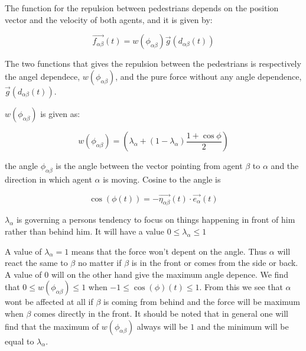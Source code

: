 The function for the repulsion between pedestrians depends on the position vector and the velocity of 
both agents, and it is given by:

\begin{equation}
        \vec{f_{\alpha \beta }}\left( t \right) = w\left(\phi_{\alpha \beta}\right)\vec{g}\left(d_{\alpha \beta}(t)\right)
    \label{eq:agentinteraction}
\end{equation}

The two functions that gives the repulsion between the pedestrians is respectively the angel dependece, $ w\left(\phi_{\alpha \beta}\right)$, and the pure force without any angle dependence, $\vec{g}\left(d_{\alpha \beta}(t)\right)$.

$ w\left(\phi_{\alpha \beta}\right)$ is given as: 

\begin{equation}
    w\left(\phi_{\alpha \beta}\right)=
    \left(
        \lambda_{\alpha} + \left(
            1 - \lambda_{\alpha}
        \right)
		\frac{1+\cos{\phi}}{2}
    \right) 
    \label{angleAB}
\end{equation}

the angle $\phi_{\alpha \beta}$ is the angle between the 
vector pointing from agent $\beta$ to $\alpha$ and the direction in which 
agent $\alpha$ is moving. Cosine to the angle is 

\begin{equation}
\cos \left( \phi \left( t \right) \right)
		= 
	- \vec{\eta_{\alpha \beta}}
		\left( t \right) 
	\cdot 
\vec{e_{\alpha}}\left( t \right)
\end{equation}

$\lambda_{\alpha}$ is governing a persons tendency to focus on things happening in front of him 
rather than behind him. It will have a value  $0\leq \lambda_{\alpha}\leq 1$

A value of $\lambda_{\alpha}=1$ means that the force won't depent on the angle. Thus $\alpha$ will react the same to $\beta$ no matter if $\beta$ is in the front or comes from the side or back. A value of $0$ will on the other hand give the maximum angle depence. We find that $0\leq w\left(\phi_{\alpha \beta}\right)\leq1$ when $-1 \leq \cos \left( \phi \right) \left( t \right) \leq 1$. From this we see that $\alpha$ wont be affected at all if $\beta$ is coming from behind and the force will be maximum when $\beta$ comes directly in the front. It should be noted that in general one will find that the maximum of $w\left(\phi_{\alpha \beta}\right)$ always will be $1$ and the minimum will be equal to $\lambda_{\alpha}$.   


